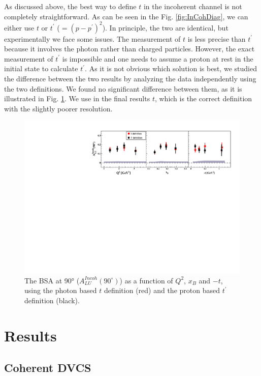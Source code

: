 \documentclass{article}
\begin{document}
As discussed above, the best way to define $t$ in the incoherent channel is not completely
straightforward. As can be seen in the Fig. \ref{fig:InCohDiag}, 
we can either use $t$ or $t^\prime$ ($= (p - p^\prime)^2$). In principle, the two are 
identical, but experimentally we face some issues. The measurement of $t$ is less precise than
$t^\prime$ because it involves the photon rather than charged particles. However, the 
exact measurement of $t^\prime$ is impossible and one needs to assume a proton at rest
in the initial state to calculate $t^\prime$. As it is not obvious which solution is best,
we studied the difference between the two results by analyzing the data independently using the two 
definitions. We found no significant difference between them, as it is 
illustrated in Fig. \ref{fig:ttpComp}. We use in the final results $t$,
which is the correct definition with the slightly poorer resolution.

\begin{figure}[tbp!]
\center
\includegraphics[width=15cm]{fig3/t_tprime_ALU_90_p_shortscenrario.pdf}
	\caption{The BSA at 90° ($A_{LU}^{Incoh} (90^\circ)$) as a
	function of $Q^2$, $x_{B}$ and $-t$, using the photon based $t$ definition (red)
	and the proton based $t^\prime$ definition (black).}
\label{fig:ttpComp}
\end{figure}

\section{Results}

\subsection{Coherent DVCS}
\end{document}
